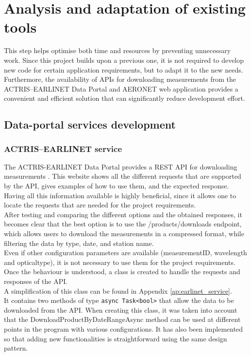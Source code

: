 \section{Analysis and adaptation of existing tools}
{This step helps optimise both time and resources by preventing unnecessary work. Since this project builds upon a previous one, it is not required to develop new code for certain application requirements, but to adapt it to the new needs. Furthermore, the availability of APIs for downloading measurements from the ACTRIS–EARLINET Data Portal \cite{earlinet_web} and AERONET web application \cite{aeronet_web} provides a convenient and efficient solution that can significantly reduce development effort.}
\smallskip
\subsection{Data-portal services development}
\subsubsection{ACTRIS–EARLINET service} 
\smallskip
{The ACTRIS-EARLINET Data Portal provides a REST API for downloading measurements \cite{rest_api_earlinet}. This website shows all the different requests that are supported by the API, gives examples of how to use them, and the expected response.\smallskip\\
Having all this information available is highly beneficial, since it allows one to locate the requests that are needed for the project requirements.\smallskip\\
After testing and comparing the different options and the obtained responses, it becomes clear that the best option is to use the /products/downloads endpoint, which allows users to download the measurements in a compressed format, while filtering the data by type, date, and station name.\smallskip\\
Even if other configuration parameters are available (measurementID, wavelength and opticaltype), it is not necessary to use them for the project requirements.\smallskip\\
Once the behaviour is understood, a class is created to handle the requests and responses of the API.\smallskip\\
A simplification of this class can be found in Appendix \ref{ap:earlinet_service}.\smallskip\\
It contains two methods of type \texttt{async Task<bool>} that allow the data to be downloaded from the API. When creating this class, it was taken into account that the DownloadProductByDateRangeAsync method can be used at different points in the program with various configurations. It has also been implemented so that adding new functionalities is straightforward using the same design pattern.}
